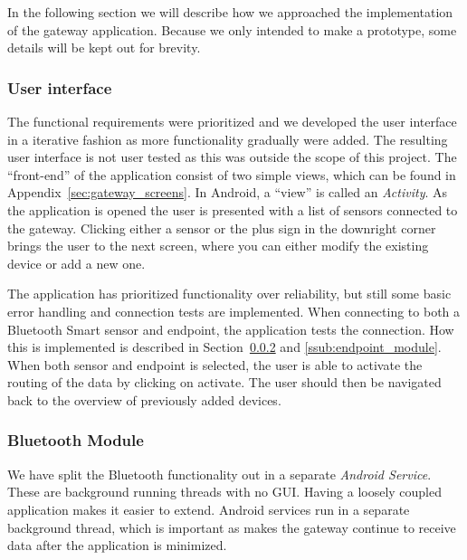 In the following section we will describe how we approached the implementation of the gateway application. Because we only intended to make a prototype, some details will be kept out for brevity. 

\subsubsection{User interface} %
\label{ssub:the_user_interface}

The functional requirements were prioritized and we developed the user interface in a iterative fashion as more functionality gradually were added. The resulting user interface is not user tested as this was outside the scope of this project. The ``front-end'' of the application consist of two simple views, which can be found in Appendix~\ref{sec:gateway_screens}. In Android, a ``view'' is called an \emph{Activity}. As the application is opened the user is presented with a list of sensors connected to the gateway. Clicking either a sensor or the plus sign in the downright corner brings the user to the next screen, where you can either modify the existing device or add a new one. 

The application has prioritized functionality over reliability, but still some basic error handling and connection tests are implemented. When connecting to both a Bluetooth Smart sensor and endpoint, the application tests the connection. How this is implemented is described in Section~\ref{ssub:bluetooth_module} and \ref{ssub:endpoint_module}. When both sensor and endpoint is selected, the user is able to activate the routing of the data by clicking on activate. The user should then be navigated back to the overview of previously added devices.


\subsubsection{Bluetooth Module} %
\label{ssub:bluetooth_module}


We have split the Bluetooth functionality out in a separate \emph{Android Service}. These are background running threads with no GUI. Having a loosely coupled application makes it easier to extend. Android services run in a separate background thread, which is important as makes the gateway continue to receive data after the application is minimized.

